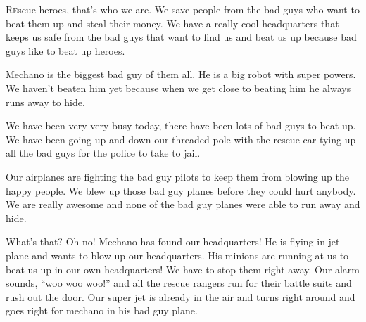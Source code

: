 \lettrine[lines=2,lraise=0]{R}escue heroes, that's who we are. We save people from the bad guys who want to beat them up and steal their money. We have a really cool headquarters that keeps us safe from the bad guys that want to find us and beat us up because bad guys like to beat up heroes.

Mechano is the biggest bad guy of them all. He is a big robot with super powers. We haven't beaten him yet because when we get close to beating him he always runs away to hide.

We have been very very busy today, there have been lots of bad guys to beat up. We have been going up and down our threaded pole with the rescue car tying up all the bad guys for the police to take to jail.

Our airplanes are fighting the bad guy pilots to keep them from blowing up the happy people. We blew up those bad guy planes before they could hurt anybody. We are really awesome and none of the bad guy planes were able to run away and hide.

What's that? Oh no! Mechano has found our headquarters! He is flying in jet plane and wants to blow up our headquarters. His minions are running at us to beat us up in our own headquarters! We have to stop them right away. Our alarm sounds, ``woo woo woo!'' and all the rescue rangers run for their battle suits and rush out the door. Our super jet is already in the air and turns right around and goes right for mechano in his bad guy plane.

